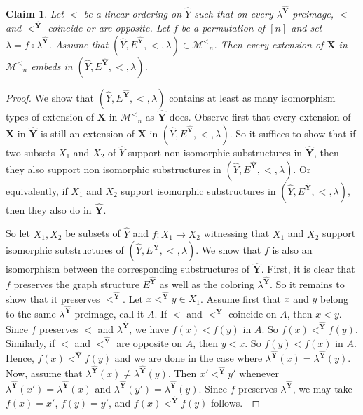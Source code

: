 \documentclass[reqno]{amsart}
\newtheorem{claimm}{Claim}
\begin{document}
\begin{claimm}
\label{claim:Yeq<}
Let $<$ be a linear ordering on $\hat{Y}$ such that on every $\lambda^{{\widehat{\textbf{{Y}}}}}$-preimage, $<$ and $<^{{\widehat{\textbf{{Y}}}}}$ coincide or are opposite. Let $f$ be a permutation of $[n]$ and set $\lambda = f \circ \lambda^{{\widehat{\textbf{{Y}}}}}$. Assume that $(\hat{Y}, E^{{\widehat{\textbf{{Y}}}}}, <, \lambda) \in {\mathcal{M}^<} _n$. Then every extension of ${\textbf{{X}}}$ in ${\mathcal{M}^<} _n$ embeds in $(\hat{Y}, E^{{\widehat{\textbf{{Y}}}}}, <, \lambda)$. 
\end{claimm}

\begin{proof}

We show that $(\hat{Y}, E^{{\widehat{\textbf{{Y}}}}}, <, \lambda)$ contains at least as many isomorphism types of extension of ${\textbf{{X}}}$ in ${\mathcal{M}^<} _n$ as ${\widehat{\textbf{{Y}}}}$ does. Observe first that every extension of ${\textbf{{X}}}$ in ${\widehat{\textbf{{Y}}}}$ is still an extension of ${\textbf{{X}}}$ in $(\hat{Y}, E^{{\widehat{\textbf{{Y}}}}}, <, \lambda)$. So it suffices to show that if two subsets $X_1$ and $X_2$ of $\hat{Y}$ support non isomorphic substructures in ${\widehat{\textbf{{Y}}}}$, then they also support non isomorphic substructures in $(\hat{Y}, E^{{\widehat{\textbf{{Y}}}}}, <, \lambda)$. Or equivalently, if $X_1$ and $X_2$ support isomorphic substructures in $(\hat{Y}, E^{{\widehat{\textbf{{Y}}}}}, <, \lambda)$, then they also do in ${\widehat{\textbf{{Y}}}}$. 

So let $X_1, X_2$ be subsets of $\hat{Y}$ and $f:{{X_1} \longrightarrow {X_2}}$ witnessing that $X_1$ and $X_2$ support isomorphic substructures of $(\hat{Y}, E^{{\widehat{\textbf{{Y}}}}}, <, \lambda)$. We show that $f$ is also an isomorphism between the corresponding substructures of ${\widehat{\textbf{{Y}}}}$. First, it is clear that $f$ preserves the graph structure $E^{{\widehat{\textbf{{Y}}}}}$ as well as the coloring $\lambda^{{\widehat{\textbf{{Y}}}}}$. So it remains to show that it preserves $<^{{\widehat{\textbf{{Y}}}}}$. Let $x <^{{\widehat{\textbf{{Y}}}}} y \in X_1$. Assume first that $x$ and $y$ belong to the same $\lambda^{{\widehat{\textbf{{Y}}}}}$-preimage, call it $A$. If $<$ and $<^{{\widehat{\textbf{{Y}}}}}$ coincide on $A$, then $x < y$. Since $f$ preserves $<$ and $\lambda^{{\widehat{\textbf{{Y}}}}}$, we have $f(x)<f(y)$ in $A$. So $f(x) <^{{\widehat{\textbf{{Y}}}}} f(y)$. Similarly, if $<$ and $<^{{\widehat{\textbf{{Y}}}}}$ are opposite on $A$, then $y < x$. So $f(y)<f(x)$ in $A$. Hence, $f(x) <^{{\widehat{\textbf{{Y}}}}} f(y)$ and we are done in the case where $\lambda^{{\widehat{\textbf{{Y}}}}}(x) = \lambda^{{\widehat{\textbf{{Y}}}}}(y)$. Now, assume that $\lambda^{{\widehat{\textbf{{Y}}}}}(x)\neq\lambda^{{\widehat{\textbf{{Y}}}}}(y)$. Then $x' <^{{\widehat{\textbf{{Y}}}}} y'$ whenever $\lambda^{{\widehat{\textbf{{Y}}}}}(x')=\lambda^{{\widehat{\textbf{{Y}}}}}(x)$ and $\lambda^{{\widehat{\textbf{{Y}}}}}(y')=\lambda^{{\widehat{\textbf{{Y}}}}}(y)$. Since $f$ preserves $\lambda^{{\widehat{\textbf{{Y}}}}}$, we may take $f(x)=x'$, $f(y)=y'$, and $f(x) <^{{\widehat{\textbf{{Y}}}}} f(y)$ follows. $\qedhere$ \end{proof}
\end{document}
